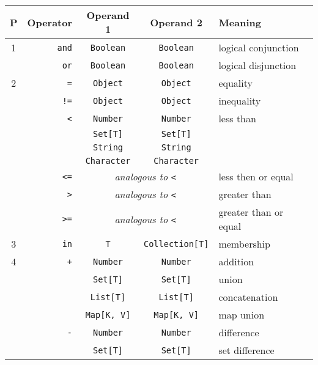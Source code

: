 
\begin{center}
\begin{tabular}[h]{|c|r|c|c|p{3.5cm}|}
{\bf P} & {\bf Operator}  & {\bf Operand 1} & {\bf Operand 2} & {\bf Meaning}  \\
\hline\hline
1 & {\tt and}  & {\tt Boolean} & {\tt Boolean} & logical conjunction \\ \cline{2-5}
  & {\tt or}   & {\tt Boolean} & {\tt Boolean} & logical disjunction \\ \hline

2  & {\tt =}     & {\tt Object} & {\tt Object} & equality \\ \cline{2-5}
   & {\tt !=}    & {\tt Object} & {\tt Object} & inequality \\ \cline{2-5}
   & {\tt <}     & {\tt Number} & {\tt Number} &  less than\\ \cline{3-5}
   &             & {\tt Set[T]} & {\tt Set[T]} &  \\ \cline{3-5}
            &    & {\tt String} & {\tt String} &  \\ \cline{3-5}
            &    & {\tt Character} & {\tt Character} &  \\ \cline{2-5}
   & {\tt <=}     & \multicolumn{2}{c|}{\em analogous to {\tt <}} &  less then or equal \\ \cline{2-5}
   & {\tt >}      & \multicolumn{2}{c|}{\em analogous to {\tt <}} &  greater than \\ \cline{2-5}
   & {\tt >=}     & \multicolumn{2}{c|}{\em analogous to {\tt <}} &  greater than or equal \\ \hline

3 & {\tt in}    & {\tt T} & {\tt Collection[T]} & membership \\\hline

4 & {\tt +}     & {\tt Number} & {\tt Number} &  addition \\ \cline{3-5}
  &           &  {\tt Set[T]} & {\tt Set[T]} & union \\ \cline{3-5}
  &           &  {\tt List[T]} & {\tt List[T]} & concatenation \\ \cline{3-5}
  &           &  {\tt Map[K, V]} & {\tt Map[K, V]} & map union \\ \cline{2-5}
  & {\tt -}     & {\tt Number} & {\tt Number} & difference \\ \cline{3-5}
  &           &  {\tt Set[T]} & {\tt Set[T]} & set difference \\ \hline


\end{tabular}
\end{center}
